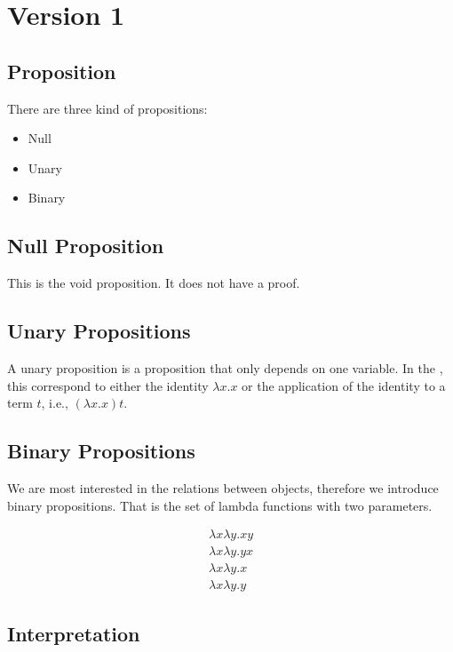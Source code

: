 \section{Version 1}

\subsection{Proposition}

There are three kind of propositions:

\begin{itemize}
    \item Null
    \item Unary
    \item Binary
\end{itemize}

\subsection{Null Proposition}

This is the void proposition. It does not have a proof.

\subsection{Unary Propositions}

A unary proposition is a proposition that only depends on one variable. In the \lcalc, this correspond to either the identity $\lambda x.x$ or the application of the identity to a term $t$, i.e., $(\lambda x.x)t$.

\subsection{Binary Propositions}

We are most interested in the relations between objects, therefore we introduce binary propositions. That is the set of lambda functions with two parameters.

\begin{align}
\lambda x\lambda y.xy\\
\lambda x\lambda y.yx\\
\lambda x\lambda y.x\\
\lambda x\lambda y.y
\end{align}

\subsection{Interpretation}

